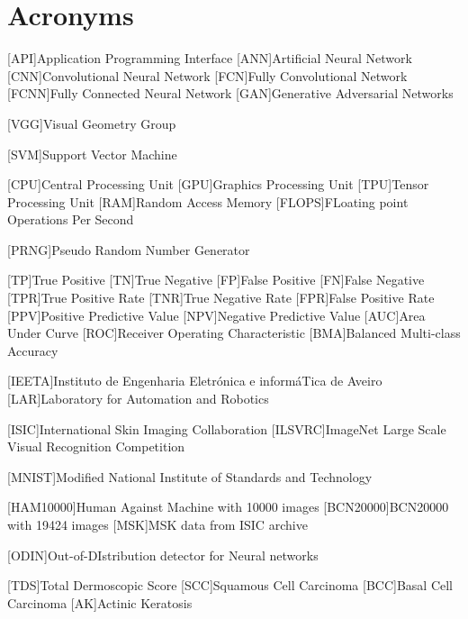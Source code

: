 \chapter{Acronyms}

\footnotesize
\SingleSpacing

\begin{multicols}{2}
\begin{acronym}[AAAAAA]

    [API]{Application Programming Interface}
	[ANN]{Artificial Neural Network}
	[CNN]{Convolutional Neural Network}
    [FCN]{Fully Convolutional Network}
	[FCNN]{Fully Connected Neural Network}
    [GAN]{Generative Adversarial Networks}

	[VGG]{Visual Geometry Group}

	[SVM]{Support Vector Machine}

	[CPU]{Central Processing Unit}
    [GPU]{Graphics Processing Unit}
    [TPU]{Tensor Processing Unit}
	[RAM]{Random Access Memory}
    [FLOPS]{FLoating point Operations Per Second}
	
	[PRNG]{Pseudo Random Number Generator}

    [TP]{True Positive}
    [TN]{True Negative}
    [FP]{False Positive}
    [FN]{False Negative}
    [TPR]{True Positive Rate}
    [TNR]{True Negative Rate}
    [FPR]{False Positive Rate}
    [PPV]{Positive Predictive Value}
    [NPV]{Negative Predictive Value}
    [AUC]{Area Under Curve}
    [ROC]{Receiver Operating Characteristic}
    [BMA]{Balanced Multi-class Accuracy}

    [IEETA]{Instituto de Engenharia Eletrónica e informáTica de Aveiro}
    [LAR]{Laboratory for Automation and Robotics}
    
    [ISIC]{International Skin Imaging Collaboration}
    [ILSVRC]{ImageNet Large Scale Visual Recognition Competition}
    
    [MNIST]{Modified National Institute of Standards and Technology}
        
    [HAM10000]{Human Against Machine with 10000 images}
    [BCN20000]{BCN20000 with 19424 images}
    [MSK]{MSK data from ISIC archive}

	[ODIN]{Out-of-DIstribution detector for Neural networks}
	
    [TDS]{Total Dermoscopic Score}
	[SCC]{Squamous Cell Carcinoma}
	[BCC]{Basal Cell Carcinoma}
	[AK]{Actinic Keratosis}
	
\end{acronym}
\end{multicols}

